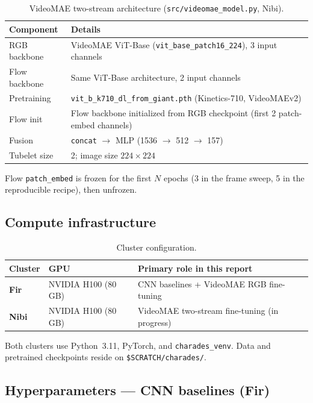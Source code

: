 \documentclass[11pt,a4paper]{article}
\begin{document}
\begin{table}[h]
\centering
\caption{VideoMAE two-stream architecture (\texttt{src/videomae\_model.py}, Nibi).}
\begin{tabular}{@{}ll@{}}
\toprule
Component & Details \\
\midrule
RGB backbone & VideoMAE ViT-Base (\texttt{vit\_base\_patch16\_224}), 3 input channels \\
Flow backbone & Same ViT-Base architecture, 2 input channels \\
Pretraining & \texttt{vit\_b\_k710\_dl\_from\_giant.pth} (Kinetics-710, VideoMAEv2) \\
Flow init & Flow backbone initialized from RGB checkpoint (first 2 patch-embed channels) \\
Fusion & \texttt{concat} $\rightarrow$ MLP (1536 $\rightarrow$ 512 $\rightarrow$ 157) \\
Tubelet size & 2; image size $224 \times 224$ \\
\bottomrule
\end{tabular}
\end{table}

Flow \texttt{patch\_embed} is frozen for the first $N$ epochs (3 in the frame sweep,
5 in the reproducible recipe), then unfrozen.

\subsection{Compute infrastructure}

\begin{table}[h]
\centering
\caption{Cluster configuration.}
\begin{tabular}{@{}lll@{}}
\toprule
Cluster & GPU & Primary role in this report \\
\midrule
\textbf{Fir} & NVIDIA H100 (80\,GB) & CNN baselines + VideoMAE RGB fine-tuning \\
\textbf{Nibi} & NVIDIA H100 (80\,GB) & VideoMAE two-stream fine-tuning (in progress) \\
\bottomrule
\end{tabular}
\end{table}

Both clusters use Python~3.11, PyTorch, and \texttt{charades\_venv}. Data and pretrained
checkpoints reside on \texttt{\$SCRATCH/charades/}.

\subsection{Hyperparameters --- CNN baselines (Fir)}
\end{document}
